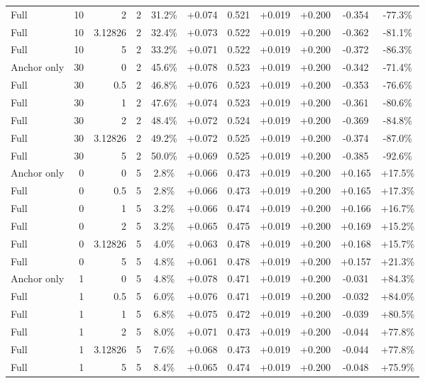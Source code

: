 \begin{table}[htbp]
\begin{tabular}{lrrrccccccc}
Full & 10 & 2 & 2 & 31.2\% & +0.074 & 0.521 & +0.019 & +0.200 & -0.354 & -77.3\% \\
Full & 10 & 3.12826 & 2 & 32.4\% & +0.073 & 0.522 & +0.019 & +0.200 & -0.362 & -81.1\% \\
Full & 10 & 5 & 2 & 33.2\% & +0.071 & 0.522 & +0.019 & +0.200 & -0.372 & -86.3\% \\
Anchor only & 30 & 0 & 2 & 45.6\% & +0.078 & 0.523 & +0.019 & +0.200 & -0.342 & -71.4\% \\
Full & 30 & 0.5 & 2 & 46.8\% & +0.076 & 0.523 & +0.019 & +0.200 & -0.353 & -76.6\% \\
Full & 30 & 1 & 2 & 47.6\% & +0.074 & 0.523 & +0.019 & +0.200 & -0.361 & -80.6\% \\
Full & 30 & 2 & 2 & 48.4\% & +0.072 & 0.524 & +0.019 & +0.200 & -0.369 & -84.8\% \\
Full & 30 & 3.12826 & 2 & 49.2\% & +0.072 & 0.525 & +0.019 & +0.200 & -0.374 & -87.0\% \\
Full & 30 & 5 & 2 & 50.0\% & +0.069 & 0.525 & +0.019 & +0.200 & -0.385 & -92.6\% \\
Anchor only & 0 & 0 & 5 & 2.8\% & +0.066 & 0.473 & +0.019 & +0.200 & +0.165 & +17.5\% \\
Full & 0 & 0.5 & 5 & 2.8\% & +0.066 & 0.473 & +0.019 & +0.200 & +0.165 & +17.3\% \\
Full & 0 & 1 & 5 & 3.2\% & +0.066 & 0.474 & +0.019 & +0.200 & +0.166 & +16.7\% \\
Full & 0 & 2 & 5 & 3.2\% & +0.065 & 0.475 & +0.019 & +0.200 & +0.169 & +15.2\% \\
Full & 0 & 3.12826 & 5 & 4.0\% & +0.063 & 0.478 & +0.019 & +0.200 & +0.168 & +15.7\% \\
Full & 0 & 5 & 5 & 4.8\% & +0.061 & 0.478 & +0.019 & +0.200 & +0.157 & +21.3\% \\
Anchor only & 1 & 0 & 5 & 4.8\% & +0.078 & 0.471 & +0.019 & +0.200 & -0.031 & +84.3\% \\
Full & 1 & 0.5 & 5 & 6.0\% & +0.076 & 0.471 & +0.019 & +0.200 & -0.032 & +84.0\% \\
Full & 1 & 1 & 5 & 6.8\% & +0.075 & 0.472 & +0.019 & +0.200 & -0.039 & +80.5\% \\
Full & 1 & 2 & 5 & 8.0\% & +0.071 & 0.473 & +0.019 & +0.200 & -0.044 & +77.8\% \\
Full & 1 & 3.12826 & 5 & 7.6\% & +0.068 & 0.473 & +0.019 & +0.200 & -0.044 & +77.8\% \\
Full & 1 & 5 & 5 & 8.4\% & +0.065 & 0.474 & +0.019 & +0.200 & -0.048 & +75.9\% \\

\end{tabular}
\end{table}
